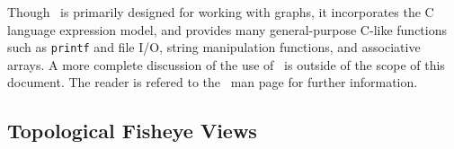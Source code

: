 Though \gvpr\ is primarily designed for working with graphs, it incorporates the C language
expression model, and provides many general-purpose C-like functions such as {\tt printf} and file I/O,
string manipulation functions, and associative arrays. A more complete discussion of the use of
\gvpr\ is outside of the scope of this document. The reader is refered to the \gvpr\ man page for
further information. 

\subsection{Topological Fisheye Views}
\label{sec:topfish}
